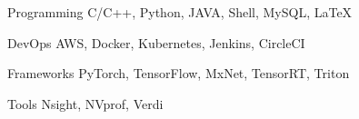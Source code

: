 

\begin{cvskills}

  \cvskill
    {Programming} %
    {C/C++, Python, JAVA, Shell, MySQL, LaTeX} %

  \cvskill
    {DevOps} %
    {AWS, Docker, Kubernetes, Jenkins, CircleCI} %

  \cvskill
    {Frameworks} %
    {PyTorch, TensorFlow, MxNet, TensorRT, Triton} %

  \cvskill
    {Tools} %
    {Nsight, NVprof, Verdi} %

\end{cvskills}

